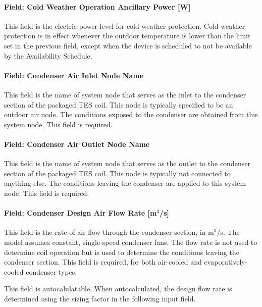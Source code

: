 \paragraph{Field: Cold Weather Operation Ancillary Power {[}W{]}}\label{field-cold-weather-operation-ancillary-power-w}

This field is the electric power level for cold weather protection. Cold weather protection is in effect whenever the outdoor temperature is lower than the limit set in the previous field, except when the device is scheduled to not be available by the Availability Schedule.

\paragraph{Field: Condenser Air Inlet Node Name}\label{field-condenser-air-inlet-node-name-5}

This field is the name of system node that serves as the inlet to the condenser section of the packaged TES coil. This node is typically specified to be an outdoor air node. The conditions exposed to the condenser are obtained from this system node. This field is required.

\paragraph{Field: Condenser Air Outlet Node Name}\label{field-condenser-air-outlet-node-name}

This field is the name of system node that serves as the outlet to the condenser section of the packaged TES coil. This node is typically not connected to anything else. The conditions leaving the condenser are applied to this system node. This field is required.

\paragraph{Field: Condenser Design Air Flow Rate {[}m\(^{3}\)/s{]}}\label{field-condenser-design-air-flow-rate-m3s}

This field is the rate of air flow through the condenser section, in m\(^{3}\)/s. The model assumes constant, single-speed condenser fans. The flow rate is not used to determine coil operation but is used to determine the conditions leaving the condenser section. This field is required, for both air-cooled and evaporatively-cooled condenser types.

This field is autocalulatable. When autocalculated, the design flow rate is determined using the sizing factor in the following input field.

